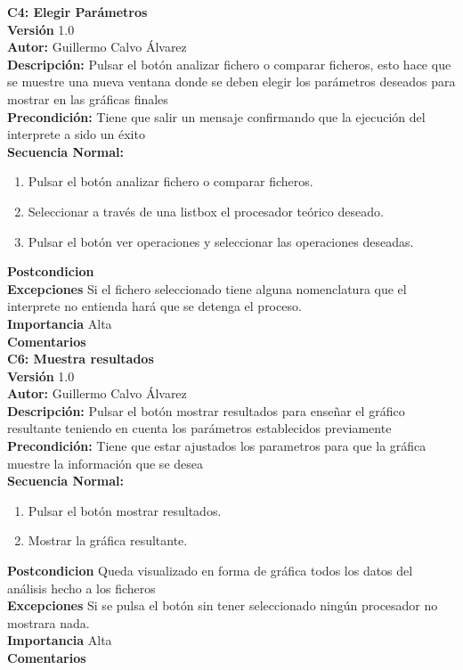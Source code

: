 \textbf{C4: Elegir Parámetros}\\
\textbf{Versión} 1.0\\
\textbf{Autor:}  Guillermo Calvo Álvarez\\
\textbf{Descripción:} Pulsar el botón analizar fichero o comparar ficheros, esto hace que se  muestre una nueva ventana donde se deben elegir los parámetros deseados para mostrar en las gráficas finales \\
\textbf{Precondición:} Tiene que salir un mensaje confirmando que la ejecución del interprete a sido un éxito\\
\textbf{Secuencia Normal:}\\
\begin{enumerate}
	\item Pulsar el botón analizar fichero o comparar ficheros.
	\item Seleccionar a través de una listbox el procesador teórico deseado. 
	\item Pulsar el botón ver operaciones y seleccionar las operaciones deseadas. 
\end{enumerate}
\textbf{Postcondicion} \\
\textbf{Excepciones} Si el fichero seleccionado tiene alguna nomenclatura que el interprete no entienda hará que se detenga el proceso.\\
\textbf{Importancia} Alta\\
\textbf{Comentarios}\\

\textbf{C6: Muestra resultados}\\
\textbf{Versión} 1.0\\
\textbf{Autor:}  Guillermo Calvo Álvarez\\
\textbf{Descripción:} Pulsar el botón mostrar resultados para enseñar el gráfico resultante teniendo en cuenta los parámetros establecidos previamente\\
\textbf{Precondición:} Tiene que estar ajustados los parametros para que  la gráfica muestre la información que se desea\\
\textbf{Secuencia Normal:}\\
\begin{enumerate}
	\item Pulsar el botón mostrar resultados.
	\item Mostrar la gráfica resultante. 
\end{enumerate}
\textbf{Postcondicion} Queda visualizado en forma de gráfica todos los datos del análisis hecho a los ficheros\\
\textbf{Excepciones} Si se pulsa el botón sin tener seleccionado ningún procesador no mostrara nada.\\
\textbf{Importancia} Alta\\
\textbf{Comentarios}\\

